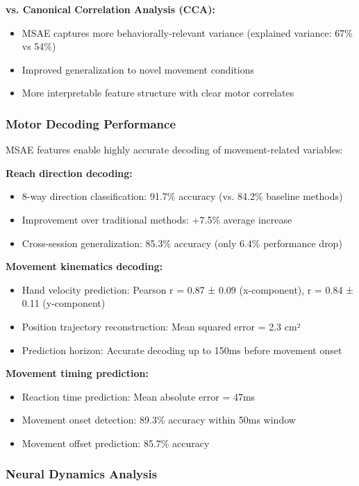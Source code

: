 \textbf{vs. Canonical Correlation Analysis (CCA):}
\begin{itemize}
\item MSAE captures more behaviorally-relevant variance (explained variance: 67\% vs 54\%)
\item Improved generalization to novel movement conditions
\item More interpretable feature structure with clear motor correlates
\end{itemize}

\subsubsection{Motor Decoding Performance}

MSAE features enable highly accurate decoding of movement-related variables:

\textbf{Reach direction decoding:}
\begin{itemize}
\item 8-way direction classification: 91.7\% accuracy (vs. 84.2\% baseline methods)
\item Improvement over traditional methods: +7.5\% average increase
\item Cross-session generalization: 85.3\% accuracy (only 6.4\% performance drop)
\end{itemize}

\textbf{Movement kinematics decoding:}
\begin{itemize}
\item Hand velocity prediction: Pearson r = 0.87 ± 0.09 (x-component), r = 0.84 ± 0.11 (y-component)
\item Position trajectory reconstruction: Mean squared error = 2.3 cm²
\item Prediction horizon: Accurate decoding up to 150ms before movement onset
\end{itemize}

\textbf{Movement timing prediction:}
\begin{itemize}
\item Reaction time prediction: Mean absolute error = 47ms
\item Movement onset detection: 89.3\% accuracy within 50ms window
\item Movement offset prediction: 85.7\% accuracy
\end{itemize}

\subsubsection{Neural Dynamics Analysis}

